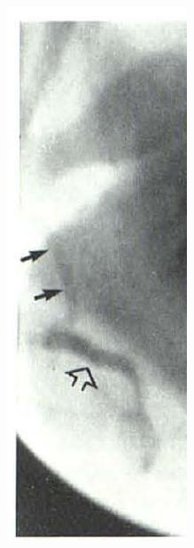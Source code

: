 \documentclass[10pt]{article}
\begin{document}
\begin{center}
\includegraphics[max width=\textwidth]{2024_06_14_c4d4aa4cd6b567f8b92fg-1}
\end{center}
\end{document}
